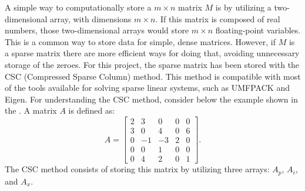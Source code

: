 A simple way to computationally store a $m \times n$ matrix $M$ is by utilizing a two-dimensional array, with dimensions $m \times n$. If this matrix is composed of real numbers, those two-dimensional arrays would store $m \times n$ floating-point variables. This is a common way to store data for simple, dense matrices. However, if $M$ is a sparse matrix there are more efficient ways for doing that, avoiding unnecessary storage of the zeroes. For this project, the sparse matrix has been stored with the CSC (Compressed Sparse Column) method. This method is compatible with most of the tools available for solving sparse linear systems, such as UMFPACK and Eigen. For understanding the CSC method, consider below the example shown in the \cite{UMFPACK}. A matrix $A$ is defined as:
\begin{equation}
	A = 
	\begin{bmatrix}
	2	&3	&0	&0	&0\\
	3	&0	&4	&0	&6\\
	0	&-1	&-3	&2	&0\\
	0	&0	&1	&0	&0\\
	0	&4	&2	&0	&1
	\end{bmatrix}
	.
\end{equation}
The CSC method consists of storing this matrix by utilizing three arrays: $A_p$, $A_i$, and $A_x$. 

